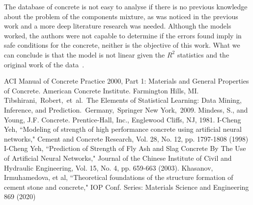 \documentclass[conference]{IEEEtran}
\begin{document}
The database of concrete is not easy to analyse if there is no previous knowledge about the problem of the components mixture, as was noticed in the previous work and a more deep literature research was needed. Although the models worked, the authors were not capable to determine if the errors found imply in safe conditions for the concrete, neither is the objective of this work. What we can conclude is that the model is not linear given the $R^2$ statistics and the original work of the data~\cite{b4}.

\begin{thebibliography}{00}
 ACI Manual of Concrete Practice 2000, Part 1: Materials and General Properties of Concrete.  American Concrete Institute.  Farmington Hills, MI.
 Tibshirani, Robert, et al. The Elements of  Statistical Learning:  Data Mining, Inference, and Prediction. Germany, Springer New York, 2009.
 Mindess, S., and Young, J.F. Concrete. Prentice-Hall, Inc., Englewood Cliffs, NJ, 1981.
 I-Cheng Yeh, ``Modeling of strength of high performance concrete using artificial neural networks," Cement and Concrete Research, Vol. 28, No. 12, pp. 1797-1808 (1998)
 I-Cheng Yeh, ``Prediction of Strength of Fly Ash and Slag Concrete By The Use of Artificial Neural Networks," Journal of the Chinese Institute of Civil and Hydraulic Engineering, Vol. 15, No. 4, pp. 659-663 (2003). 
 Khasanov, Irmuhamedova, et al, ``Theoretical foundations of the structure formation of cement stone
and concrete," IOP Conf. Series: Materials Science and Engineering 869 (2020)
\end{thebibliography}
\end{document}
